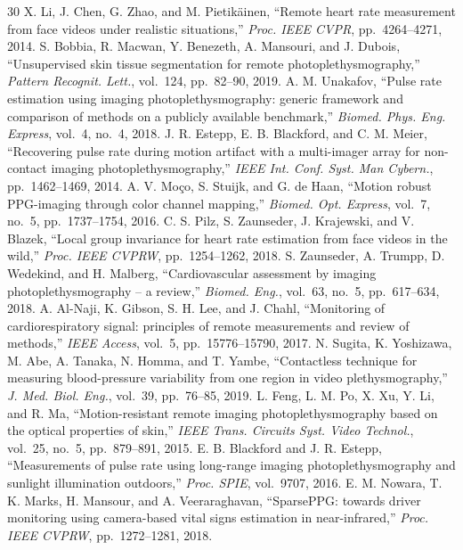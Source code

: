\documentclass[9pt,technote,twocolumn,compsoc]{article}
\begin{document}
\begin{thebibliography}{30}
 X. Li, J. Chen, G. Zhao, and M. Pietik\"ainen, ``Remote heart rate measurement from face videos under realistic situations,'' \textit{Proc. IEEE CVPR}, pp.~4264--4271, 2014.
 S. Bobbia, R. Macwan, Y. Benezeth, A. Mansouri, and J. Dubois, ``Unsupervised skin tissue segmentation for remote photoplethysmography,'' \textit{Pattern Recognit. Lett.}, vol.~124, pp.~82--90, 2019.
 A. M. Unakafov, ``Pulse rate estimation using imaging photoplethysmography: generic framework and comparison of methods on a publicly available benchmark,'' \textit{Biomed. Phys. Eng. Express}, vol.~4, no.~4, 2018.
 J. R. Estepp, E. B. Blackford, and C. M. Meier, ``Recovering pulse rate during motion artifact with a multi-imager array for non-contact imaging photoplethysmography,'' \textit{IEEE Int. Conf. Syst. Man Cybern.}, pp.~1462--1469, 2014.
 A. V. Mo\c{c}o, S. Stuijk, and G. de Haan, ``Motion robust PPG-imaging through color channel mapping,'' \textit{Biomed. Opt. Express}, vol.~7, no.~5, pp.~1737--1754, 2016.
 C. S. Pilz, S. Zaunseder, J. Krajewski, and V. Blazek, ``Local group invariance for heart rate estimation from face videos in the wild,'' \textit{Proc. IEEE CVPRW}, pp.~1254--1262, 2018.
 S. Zaunseder, A. Trumpp, D. Wedekind, and H. Malberg, ``Cardiovascular assessment by imaging photoplethysmography -- a review,'' \textit{Biomed. Eng.}, vol.~63, no.~5, pp.~617--634, 2018.
 A. Al-Naji, K. Gibson, S. H. Lee, and J. Chahl, ``Monitoring of cardiorespiratory signal: principles of remote measurements and review of methods,'' \textit{IEEE Access}, vol.~5, pp.~15776--15790, 2017.
 N. Sugita, K. Yoshizawa, M. Abe, A. Tanaka, N. Homma, and T. Yambe, ``Contactless technique for measuring blood-pressure variability from one region in video plethysmography,'' \textit{J. Med. Biol. Eng.}, vol.~39, pp.~76--85, 2019.
 L. Feng, L. M. Po, X. Xu, Y. Li, and R. Ma, ``Motion-resistant remote imaging photoplethysmography based on the optical properties of skin,'' \textit{IEEE Trans. Circuits Syst. Video Technol.}, vol.~25, no.~5, pp.~879--891, 2015.
 E. B. Blackford and J. R. Estepp, ``Measurements of pulse rate using long-range imaging photoplethysmography and sunlight illumination outdoors,'' \textit{Proc. SPIE}, vol.~9707, 2016.
 E. M. Nowara, T. K. Marks, H. Mansour, and A. Veeraraghavan, ``SparsePPG: towards driver monitoring using camera-based vital signs estimation in near-infrared,'' \textit{Proc. IEEE CVPRW}, pp.~1272--1281, 2018.

\end{thebibliography}
\end{document}
